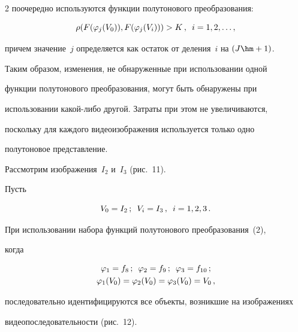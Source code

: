 \begin{multicols}{2}
поочередно используются функции полутонового преобразования:

  \begin{equation}

  \rho ( F( \varphi_j(V_0)), F(\varphi_j(V_i)))> K\,,\enskip i=1,2,\ldots ,

  \label{e4-zyk}

  \end{equation}

причем значение~$j$ определяется как остаток от деления~$i$ на $(J\hm+1)$.



\columnbreak



  Таким образом, изменения, не обнаруженные при использовании одной

функции полутонового преобразования, могут быть обнаружены при

использовании ка\-кой-ли\-бо другой. Затраты при этом не увеличиваются,

поскольку для каждого видеоизображения используется только одно

полутоновое представление.



  Рассмотрим изображения~$I_2$ и~$I_3$ (рис.~11).



  Пусть

  $$

V_0 = I_2\,;\enskip  V_i = I_3\,,\enskip  i = 1, 2, 3\,.

$$







  При использовании набора функций полутонового преобразования~(2),

когда

  \begin{gather*}

\varphi_1 = f_8\,;\enskip \varphi_2 = f_9\,;\enskip \varphi_3 = f_{10}\,;\\

\varphi_1(V_0) = \varphi_2(V_0) = \varphi_3(V_0) = V_0\,,

\end{gather*}

последовательно идентифицируются все объекты, возникшие на изображениях

видеопоследовательности (рис.~12).








\end{multicols}
